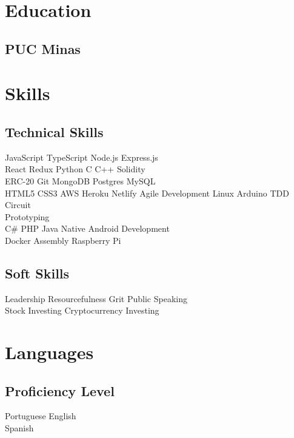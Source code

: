 \documentclass[]{deedy-resume-openfont}
\begin{document}
\begin{minipage}[t]{0.49\textwidth}
\section{Education} 

\subsection{PUC Minas}
\sectionsep


\section{Skills}
\subsection{Technical Skills}
JavaScript \textbullet{} TypeScript \textbullet{} Node.js \textbullet{} Express.js \\
React \textbullet{} Redux \textbullet{} Python \textbullet{} C \textbullet{} C++ \textbullet{} Solidity \\ ERC-20 \textbullet{} Git \textbullet{} MongoDB \textbullet{} Postgres \textbullet{} MySQL \\ HTML5 \textbullet{} CSS3 \textbullet{} AWS \textbullet{} Heroku \textbullet{} Netlify \textbullet{} Agile Development \textbullet{} Linux \textbullet{} Arduino \textbullet{} TDD \textbullet{} Circuit\\Prototyping \\
C\# \textbullet{} PHP \textbullet{} Java \textbullet{} Native Android Development \\ Docker \textbullet{} Assembly \textbullet{} Raspberry Pi
\sectionsep

\subsection{Soft Skills}
Leadership \textbullet{} Resourcefulness \textbullet{} Grit \textbullet{} Public Speaking \\
Stock Investing \textbullet{} Cryptocurrency Investing
\sectionsep

\section{Languages}
\subsection{Proficiency Level}
Portuguese \textbullet{} English \\
Spanish

%
%

\end{minipage} 
\end{document}
